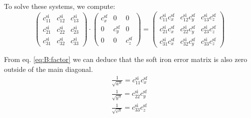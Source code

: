 To solve these systems, we compute:
\begin{equation}
    \begin{pmatrix}
        c^\mathrm{si}_{11} & c^\mathrm{si}_{12} & c^\mathrm{si}_{13} \\
        c^\mathrm{si}_{21} & c^\mathrm{si}_{22} & c^\mathrm{si}_{23} \\
        c^\mathrm{si}_{31} & c^\mathrm{si}_{32} & c^\mathrm{si}_{33} 
    \end{pmatrix}
    \cdot
    \begin{pmatrix}
        c^\mathrm{sf}_x & 0 & 0 \\
        0 & c^\mathrm{sf}_y & 0 \\
        0 & 0 & c^\mathrm{sf}_z
    \end{pmatrix}
    =
    \begin{pmatrix}
        c^\mathrm{si}_{11}c_x^{\mathrm{sf}} & c^\mathrm{si}_{12}c_y^{\mathrm{sf}} & c^\mathrm{si}_{13}c_z^{\mathrm{sf}} \\
        c^\mathrm{si}_{21}c_x^{\mathrm{sf}} & c^\mathrm{si}_{22}c_y^{\mathrm{sf}} & c^\mathrm{si}_{23}c_z^{\mathrm{sf}} \\
        c^\mathrm{si}_{31}c_x^{\mathrm{sf}} & c^\mathrm{si}_{32}c_y^{\mathrm{sf}} & c^\mathrm{si}_{33}c_z^{\mathrm{sf}}
    \end{pmatrix}
\end{equation}

From eq. \eqref{eq:B:factor} we can deduce that the soft iron error matrix is also zero outside of the main diagonal.
\begin{align}
    \frac{1}{\sqrt{a^B}} = c^\mathrm{si}_{11}c_x^{\mathrm{sf}} \\
    \frac{1}{\sqrt{b^B}} = c^\mathrm{si}_{22}c_y^{\mathrm{sf}} \\
    \frac{1}{\sqrt{c^B}} = c^\mathrm{si}_{33}c_z^{\mathrm{sf}} 
\end{align}

